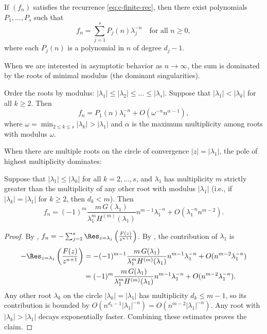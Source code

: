 \begin{corollary}
    If \((f_n)\) satisfies the recurrence \eqref{eq:c-finite-rec}, then there exist polynomials \(P_1, \dots, P_s\) such that
    \[
        f_n = \sum_{j=1}^s P_j(n) \lambda_j^{-n} \quad \text{for all } n \ge 0,
    \]
    where each \(P_j(n)\) is a polynomial in \(n\) of degree \(d_j - 1\).
\end{corollary}

When we are interested in asymptotic behavior as \(n \to \infty\), the sum is dominated by the roots of minimal modulus (the dominant singularities).

\begin{corollary}
    Order the roots by modulus: \(|\lambda_1| \le |\lambda_2| \le \dots \le |\lambda_s|\).
    Suppose that \(|\lambda_1| < |\lambda_k|\) for all \(k \ge 2\).
    Then
    \[
        f_n = P_1(n) \lambda_1^{-n} + O(\omega^{-n} n^{\alpha - 1}),
    \]
    where \(\omega = \min_{2 \le k \le s} |\lambda_k| > |\lambda_1|\) and \(\alpha\) is the maximum multiplicity among roots with modulus \(\omega\).
\end{corollary}

When there are multiple roots on the circle of convergence \(|z| = |\lambda_1|\), the pole of highest multiplicity dominates:

\begin{corollary}
    \label{cor:dominant-pole-mult}
    Suppose that \(|\lambda_1| \le |\lambda_k|\) for all \(k = 2, \dots, s\), and \(\lambda_1\) has multiplicity \(m\) strictly greater than the multiplicity of any other root with modulus \(|\lambda_1|\) (i.e., if \(|\lambda_k| = |\lambda_1|\) for \(k \ge 2\), then \(d_k < m\)).
    Then
    \[
        f_n = (-1)^m \frac{m \, G(\lambda_1)}{\lambda_1^m H^{(m)}(\lambda_1)} n^{m-1} \lambda_1^{-n} + O(\lambda_1^{-n} n^{m-2}).
    \]
\end{corollary}

\begin{proof}
    By , \(f_n = - \sum_{j=1}^s \Res_{z = \lambda_j} \left( \frac{F(z)}{z^{n+1}} \right)\).
    By , the contribution of \(\lambda_1\) is
    \begin{align*}
        - \Res_{z = \lambda_1} \left( \frac{F(z)}{z^{n+1}} \right)
        &= - (-1)^{m-1} \frac{m \, G(\lambda_1)}{\lambda_1^m H^{(m)}(\lambda_1)} n^{m-1} \lambda_1^{-n} + O(n^{m-2} \lambda_1^{-n}) \\
        &= (-1)^m \frac{m \, G(\lambda_1)}{\lambda_1^m H^{(m)}(\lambda_1)} n^{m-1} \lambda_1^{-n} + O(n^{m-2} \lambda_1^{-n}).
    \end{align*}
    Any other root \(\lambda_k\) on the circle \(|\lambda_k| = |\lambda_1|\) has multiplicity \(d_k \le m-1\), so its contribution is bounded by \(O(n^{d_k-1} |\lambda_1|^{-n}) = O(n^{m-2} |\lambda_1|^{-n})\).
    Any root with \(|\lambda_k| > |\lambda_1|\) decays exponentially faster.
    Combining these estimates proves the claim.
\end{proof}

